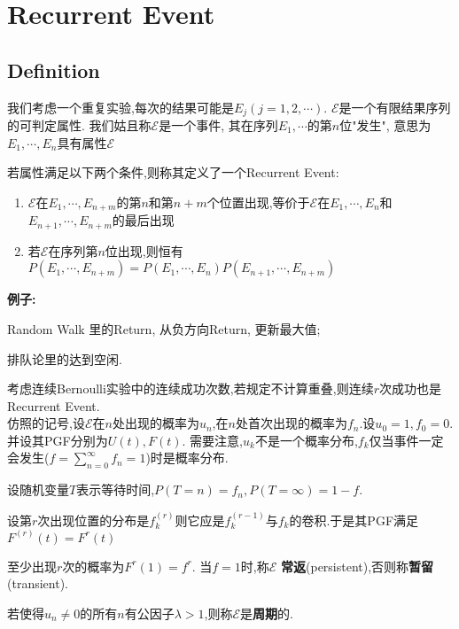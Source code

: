 \section{Recurrent Event}
\subsection{Definition}

我们考虑一个重复实验,每次的结果可能是$E_j (j = 1, 2, \cdots )$.
$\mathcal{E}$是一个有限结果序列的可判定属性.
我们姑且称$\mathcal{E}$是一个事件, 其在序列$E_1, \cdots $的第$n$位"发生",
意思为$E_1, \cdots ,E_n$具有属性$\mathcal{E}$

若属性满足以下两个条件,则称其定义了一个Recurrent Event:
\begin{enumerate}
    \item
      $ \mathcal{E}$在$ E_{1},\cdots,E_{n+m} $的第$ n$和第$ n+m$个位置出现,等价于$ \mathcal{E}$在$ E_{1},\cdots ,E_{n}$和$
      E_{n+1},\cdots ,E_{n+m}$的最后出现

      \item
        若$ \mathcal{E}$在序列第$ n$位出现,则恒有$ P(E_{1},\cdots ,E_{n+m}) = P(E_{1},\cdots ,E_{n})P(E_{n+1},\cdots ,E_{n+m})$
\end{enumerate}

\textbf{例子:}

Random Walk 里的Return, 从负方向Return, 更新最大值;

排队论里的达到空闲.

考虑连续Bernoulli实验中的连续成功次数,若规定不计算重叠,则连续$ r$次成功也是Recurrent Event.
\\

仿照的记号,设$ \mathcal{E}$在$ n$处出现的概率为$ u_n$,在$ n$处首次出现的概率为$ f_n$.设$ u_0 = 1, f_0=0$.并设其PGF分别为$ U(t),F(t)$.
需要注意,$ u_k$不是一个概率分布,$ f_k$仅当事件一定会发生($ f = \sum_{n=0}^\infty f_n = 1$)时是概率分布.

设随机变量$ T$表示等待时间,$ P(T=n) = f_n,P(T=\infty) = 1-f$.

设第$ r$次出现位置的分布是$ f^{(r)}_k$则它应是$ f^{(r-1)}_k与f_k$的卷积.于是其PGF满足 $ F^{(r)}(t) = F^r(t)$

至少出现$ r$次的概率为$ F^r(1) = f^r$. 当$ f=1$时,称$ \mathcal{E}$ \textbf{常返}(persistent),否则称\textbf{暂留}(transient).

若使得$ u_n\neq 0$的所有$ n$有公因子$ \lambda >1$,则称$ \mathcal{E}$是\textbf{周期}的.

